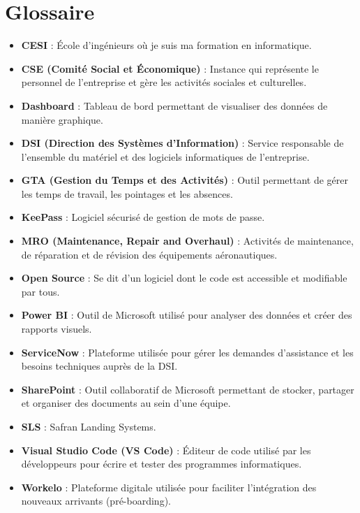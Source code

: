 \section*{Glossaire}
\begin{itemize}
  \item \textbf{CESI} : École d’ingénieurs où je suis ma formation en informatique.
  \item \textbf{CSE (Comité Social et Économique)} : Instance qui représente le personnel de l’entreprise et gère les activités sociales et culturelles.
  \item \textbf{Dashboard} : Tableau de bord permettant de visualiser des données de manière graphique.
  \item \textbf{DSI (Direction des Systèmes d'Information)} : Service responsable de l’ensemble du matériel et des logiciels informatiques de l’entreprise.
  \item \textbf{GTA (Gestion du Temps et des Activités)} : Outil permettant de gérer les temps de travail, les pointages et les absences.
  \item \textbf{KeePass} : Logiciel sécurisé de gestion de mots de passe.
  \item \textbf{MRO (Maintenance, Repair and Overhaul)} : Activités de maintenance, de réparation et de révision des équipements aéronautiques.
  \item \textbf{Open Source} : Se dit d'un logiciel dont le code est accessible et modifiable par tous.
  \item \textbf{Power BI} : Outil de Microsoft utilisé pour analyser des données et créer des rapports visuels.
  \item \textbf{ServiceNow} : Plateforme utilisée pour gérer les demandes d’assistance et les besoins techniques auprès de la DSI.
  \item \textbf{SharePoint} : Outil collaboratif de Microsoft permettant de stocker, partager et organiser des documents au sein d'une équipe.
  \item \textbf{SLS} : Safran Landing Systems.
  \item \textbf{Visual Studio Code (VS Code)} : Éditeur de code utilisé par les développeurs pour écrire et tester des programmes informatiques.
  \item \textbf{Workelo} : Plateforme digitale utilisée pour faciliter l’intégration des nouveaux arrivants (pré-boarding).
\end{itemize}